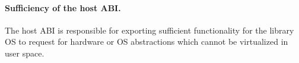 \begin{comment}
The simplicity of the host ABIs requires retaining a minimalist design of host functions. %
The host ABIs should only contain operations that
are absolutely necessary for requesting external hardware abstractions.
Any functions that can be partially or wholly implemented inside the library OS
should be further simplified, or even removed from the host ABIs.
Moreover, the host ABIs have to be simple enough to implement on
most hosts;
that is, the host ABIs should contain only OS functions that are commonly offered on
most hosts.
The host ABIs are close to simplified UNIX interfaces,
such as reading or writing a file or an I/O device as a byte stream,
or creating a virtual memory mapping.
For most hosts,
implementing the host ABI should be as straightforward as redirecting the functions to the closest host system calls.
For example, the functionality of \syscall{StreamRead} and \syscall{StreamWrite} in the host ABIs can loosely match with
\syscall{read} and \syscall{write} in Linux,
or \syscall{ReadFile} and \syscall{WriteFile} in Windows.
Since most OSes have inherited a similar design from UNIX,
it is fair to assume finding
comparable OS functions %
to the host ABI would be reasonably easy.
\end{comment}



\paragraph{Sufficiency of the host ABI.}
The host ABI is responsible for exporting sufficient functionality for the library OS to request for hardware or OS abstractions which cannot be virtualized in user space.



